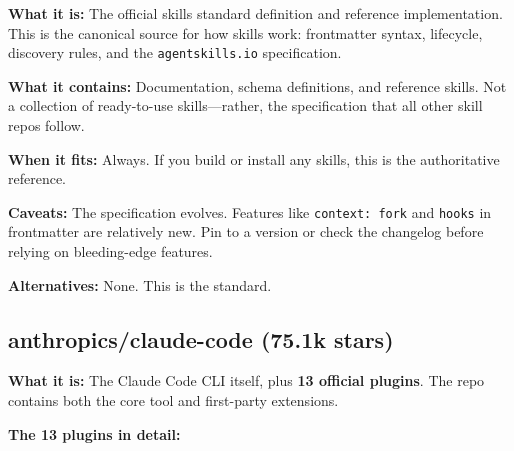 \documentclass[11pt,a4paper]{article}
\begin{document}
\textbf{What it is:} The official skills standard definition and reference implementation. This is the canonical source for how skills work: frontmatter syntax, lifecycle, discovery rules, and the \texttt{agentskills.io} specification.

\textbf{What it contains:} Documentation, schema definitions, and reference skills. Not a collection of ready-to-use skills---rather, the specification that all other skill repos follow.

\textbf{When it fits:} Always. If you build or install any skills, this is the authoritative reference.

\textbf{Caveats:} The specification evolves. Features like \texttt{context: fork} and \texttt{hooks} in frontmatter are relatively new. Pin to a version or check the changelog before relying on bleeding-edge features.

\textbf{Alternatives:} None. This is the standard.

\subsection{anthropics/claude-code (75.1k stars)}

\textbf{What it is:} The Claude Code CLI itself, plus \textbf{13 official plugins}. The repo contains both the core tool and first-party extensions.

\textbf{The 13 plugins in detail:}
\end{document}
